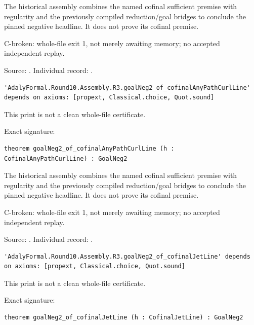 \begin{theorem}
\label{join-7}
The historical assembly combines the named cofinal sufficient premise with regularity and the previously compiled reduction/goal bridges to conclude the pinned negative headline. It does not prove its cofinal premise.
\par C-broken: whole-file exit 1, not merely awaiting memory; no accepted independent replay.
\par Source: \texttt{}. Individual record: \texttt{}.
\begin{verbatim}
'AdalyFormal.Round10.Assembly.R3.goalNeg2_of_cofinalAnyPathCurlLine' depends on axioms: [propext, Classical.choice, Quot.sound]
\end{verbatim}
This print is not a clean whole-file certificate.
\par Exact signature:
\begin{verbatim}
theorem goalNeg2_of_cofinalAnyPathCurlLine (h : CofinalAnyPathCurlLine) : GoalNeg2
\end{verbatim}
\end{theorem}

\begin{theorem}
\label{join-8}
The historical assembly combines the named cofinal sufficient premise with regularity and the previously compiled reduction/goal bridges to conclude the pinned negative headline. It does not prove its cofinal premise.
\par C-broken: whole-file exit 1, not merely awaiting memory; no accepted independent replay.
\par Source: \texttt{}. Individual record: \texttt{}.
\begin{verbatim}
'AdalyFormal.Round10.Assembly.R3.goalNeg2_of_cofinalJetLine' depends on axioms: [propext, Classical.choice, Quot.sound]
\end{verbatim}
This print is not a clean whole-file certificate.
\par Exact signature:
\begin{verbatim}
theorem goalNeg2_of_cofinalJetLine (h : CofinalJetLine) : GoalNeg2
\end{verbatim}
\end{theorem}

